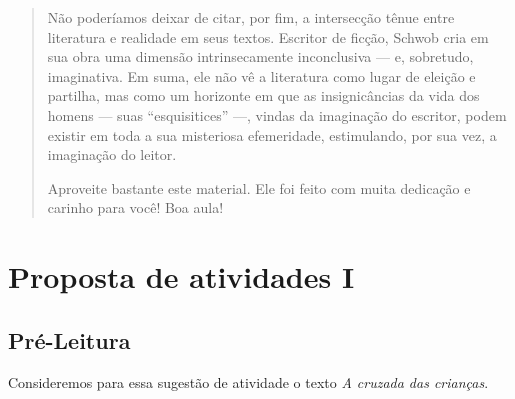 \documentclass[12pt]{extarticle}
\begin{document}
\begin{abstract}
Não poderíamos deixar de citar, por fim, a intersecção tênue entre literatura 
e realidade em seus textos. Escritor de ficção, Schwob cria em sua obra uma 
dimensão intrinsecamente inconclusiva — e, sobretudo, imaginativa. Em suma, 
ele não vê a literatura como lugar de eleição e partilha, mas como um horizonte 
em que as insignicâncias da vida dos homens — suas ``esquisitices'' —, vindas 
da imaginação do escritor, podem existir em toda a sua misteriosa efemeridade, 
estimulando, por sua vez, a imaginação do leitor.

Aproveite bastante este material. Ele foi feito com muita dedicação e
carinho para você! Boa aula!


\end{abstract}


\tableofcontents



\section{Proposta de atividades I}

\subsection{Pré-Leitura}


Consideremos para essa sugestão de atividade o texto \textit{A cruzada das crianças}. 
\end{document}
